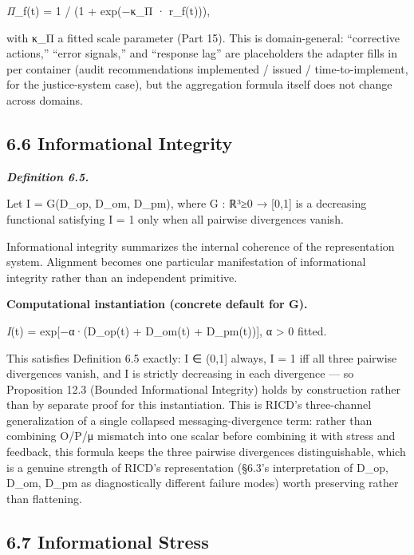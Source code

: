 \documentclass[
]{article}
\begin{document}
\emph{Π}\_f(t) = 1 / (1 + exp(−κ\_Π · r\_f(t))),

with κ\_Π a fitted scale parameter (Part 15). This is domain-general:
``corrective actions,'' ``error signals,'' and ``response lag'' are
placeholders the adapter fills in per container (audit recommendations
implemented / issued / time-to-implement, for the justice-system case),
but the aggregation formula itself does not change across domains.

\hypertarget{informational-integrity}{%
\subsection{6.6 Informational Integrity}\label{informational-integrity}}

\emph{\textbf{Definition 6.5.}}

Let I = G(D\_op, D\_om, D\_pm), where G : ℝ³≥0 → {[}0,1{]} is a
decreasing functional satisfying I = 1 only when all pairwise
divergences vanish.

Informational integrity summarizes the internal coherence of the
representation system. Alignment becomes one particular manifestation of
informational integrity rather than an independent primitive.

\textbf{Computational instantiation (concrete default for G).}

\emph{I}(t) = exp{[}−α·(D\_op(t) + D\_om(t) + D\_pm(t)){]}, α
\textgreater{} 0 fitted.

This satisfies Definition 6.5 exactly: I ∈ (0,1{]} always, I = 1 iff all
three pairwise divergences vanish, and I is strictly decreasing in each
divergence --- so Proposition 12.3 (Bounded Informational Integrity)
holds by construction rather than by separate proof for this
instantiation. This is RICD's three-channel generalization of a single
collapsed messaging-divergence term: rather than combining O/P/μ
mismatch into one scalar before combining it with stress and feedback,
this formula keeps the three pairwise divergences distinguishable, which
is a genuine strength of RICD's representation (§6.3's interpretation of
D\_op, D\_om, D\_pm as diagnostically different failure modes) worth
preserving rather than flattening.

\hypertarget{informational-stress}{%
\subsection{6.7 Informational Stress}\label{informational-stress}}
\end{document}
